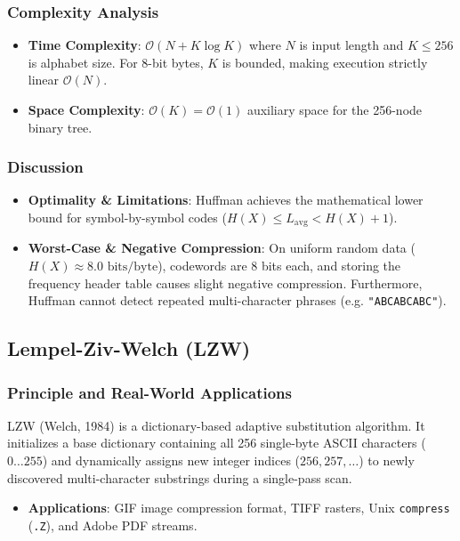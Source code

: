 \documentclass[12pt,a4paper]{article}
\begin{document}
\subsubsection{Complexity Analysis}
\begin{itemize}
    \item \textbf{Time Complexity}: $\mathcal{O}(N + K \log K)$ where $N$ is input length and $K \le 256$ is alphabet size. For 8-bit bytes, $K$ is bounded, making execution strictly linear $\mathcal{O}(N)$.
    \item \textbf{Space Complexity}: $\mathcal{O}(K) = \mathcal{O}(1)$ auxiliary space for the 256-node binary tree.
\end{itemize}

\subsubsection{Discussion}
\begin{itemize}
    \item \textbf{Optimality \& Limitations}: Huffman achieves the mathematical lower bound for symbol-by-symbol codes ($H(X) \le L_{\text{avg}} < H(X) + 1$).
    \item \textbf{Worst-Case \& Negative Compression}: On uniform random data ($H(X) \approx 8.0\text{ bits/byte}$), codewords are 8 bits each, and storing the frequency header table causes slight negative compression. Furthermore, Huffman cannot detect repeated multi-character phrases (e.g. \texttt{"ABCABCABC"}).
\end{itemize}

\subsection{Lempel-Ziv-Welch (LZW)}

\subsubsection{Principle and Real-World Applications}
LZW (Welch, 1984) is a dictionary-based adaptive substitution algorithm. It initializes a base dictionary containing all 256 single-byte ASCII characters ($0 \dots 255$) and dynamically assigns new integer indices ($256, 257, \dots$) to newly discovered multi-character substrings during a single-pass scan.
\begin{itemize}
    \item \textbf{Applications}: GIF image compression format, TIFF rasters, Unix \texttt{compress} (\texttt{.Z}), and Adobe PDF streams.
\end{itemize}
\end{document}
